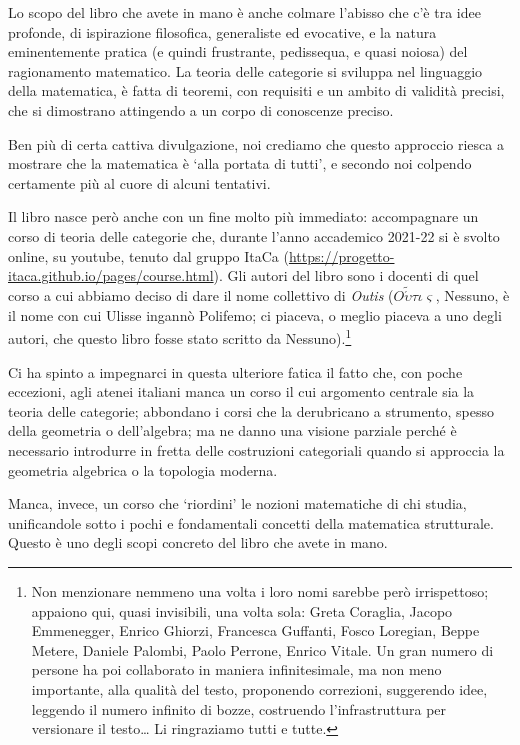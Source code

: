 \medskip
Lo scopo del libro che avete in mano è anche colmare l'abisso che c'è tra idee profonde, di ispirazione filosofica, generaliste ed evocative, e la natura eminentemente pratica (e quindi frustrante, pedissequa, e quasi noiosa) del ragionamento matematico. La teoria delle categorie si sviluppa nel linguaggio della matematica, è fatta di teoremi, con requisiti e un ambito di validità precisi, che si dimostrano attingendo a un corpo di conoscenze preciso.

Ben più di certa cattiva divulgazione, noi crediamo che questo approccio riesca a mostrare che la matematica è `alla portata di tutti', e secondo noi colpendo certamente più al cuore di alcuni tentativi.

\medskip
Il libro nasce però anche con un fine molto più immediato: accompagnare un corso di teoria delle categorie che, durante l'anno accademico 2021-22 si è svolto online, su youtube, tenuto dal gruppo ItaCa (\url{https://progetto-itaca.github.io/pages/course.html}). Gli autori del libro sono i docenti di quel corso a cui abbiamo deciso di dare il nome collettivo di \emph{Outis} (\(O\tilde{\acute\upsilon}\tau\iota\varsigma\), Nessuno, è il nome con cui Ulisse ingannò Polifemo; ci piaceva, o meglio piaceva a uno degli autori, che questo libro fosse stato scritto da Nessuno).\footnote{Non menzionare nemmeno una volta i loro nomi sarebbe però irrispettoso; appaiono qui, quasi invisibili, una volta sola:
	Greta Coraglia, Jacopo Emmenegger, Enrico Ghiorzi, Francesca Guffanti, Fosco Loregian, Beppe Metere, Daniele Palombi, Paolo Perrone, Enrico Vitale. Un gran numero di persone ha poi collaborato in maniera infinitesimale, ma non meno importante, alla qualità del testo, proponendo correzioni, suggerendo idee, leggendo il numero infinito di bozze, costruendo l'infrastruttura per versionare il testo\dots{} Li ringraziamo tutti e tutte.}

Ci ha spinto a impegnarci in questa ulteriore fatica il fatto che, con poche eccezioni, agli atenei italiani manca un corso il cui argomento centrale sia la teoria delle categorie; abbondano i corsi che la derubricano a strumento, spesso della geometria o dell'algebra; ma ne danno una visione parziale perché è necessario introdurre in fretta delle costruzioni categoriali quando si approccia la geometria algebrica o la topologia moderna.

Manca, invece, un corso che `riordini' le nozioni matematiche di chi studia, unificandole sotto i pochi e fondamentali concetti della matematica strutturale. Questo è uno degli scopi concreto del libro che avete in mano.

